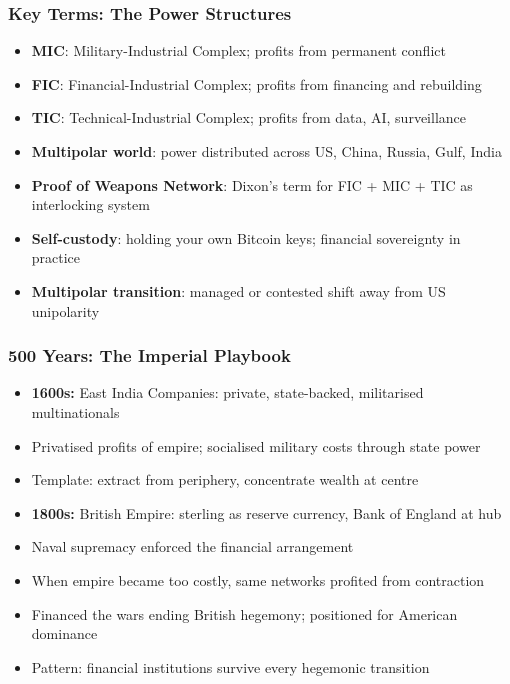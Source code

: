 \begin{frame}[fragile]\frametitle{Key Terms: The Power Structures}
  \begin{itemize}
    \item \textbf{MIC}: Military-Industrial Complex; profits from permanent conflict
    \item \textbf{FIC}: Financial-Industrial Complex; profits from financing and rebuilding
    \item \textbf{TIC}: Technical-Industrial Complex; profits from data, AI, surveillance
    \item \textbf{Multipolar world}: power distributed across US, China, Russia, Gulf, India
    \item \textbf{Proof of Weapons Network}: Dixon's term for FIC + MIC + TIC as interlocking system
    \item \textbf{Self-custody}: holding your own Bitcoin keys; financial sovereignty in practice
    \item \textbf{Multipolar transition}: managed or contested shift away from US unipolarity
  \end{itemize}
\end{frame}

\begin{frame}[fragile]\frametitle{500 Years: The Imperial Playbook}
  \begin{itemize}
    \item \textbf{1600s:} East India Companies: private, state-backed, militarised multinationals
    \item Privatised profits of empire; socialised military costs through state power
    \item Template: extract from periphery, concentrate wealth at centre
    \item \textbf{1800s:} British Empire: sterling as reserve currency, Bank of England at hub
    \item Naval supremacy enforced the financial arrangement
    \item When empire became too costly, same networks profited from contraction
    \item Financed the wars ending British hegemony; positioned for American dominance
    \item \alert{Pattern: financial institutions survive every hegemonic transition}
  \end{itemize}
\end{frame}

